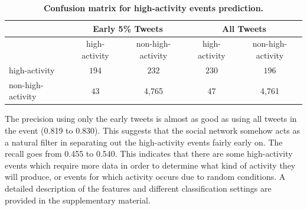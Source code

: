 \begin{table}[!htb]
  \centering
  \begin{tabularx}{\textwidth}{lcc|cc}
    \toprule
    \multirow{2}{*}{ }& \multicolumn{2}{c}{\textbf{Early 5\% Tweets}} & \multicolumn{2}{c}{\textbf{All Tweets}} \\
    \midrule
    & high-activity & non-high-activity & high-activity & non-high-activity \\
    high-activity & $194$ & $232$ & $230$ & $196$\\
    non-high-activity & $43$ & 4,765 & 47 & 4,761 \\
    \bottomrule
  \end{tabularx}
  \caption{\textbf{Confusion matrix for high-activity events prediction.}}
  \label{tab:confusion_matrix}
\end{table}



The precision using only the early tweets is almost as good as using all tweets
in the event (0.819 to 0.830). 
%
This suggests that the social network somehow acts as a natural filter in
separating out the high-activity events fairly early on.  
%
The recall goes from 0.455 to 0.540. 
%
This indicates that there are some high-activity events which require more data
in order to determine what kind of activity they will produce, or events for
which activity occurs due to random conditions. 
%
A detailed description of the features and different classification settings are
provided in the supplementary material. 


